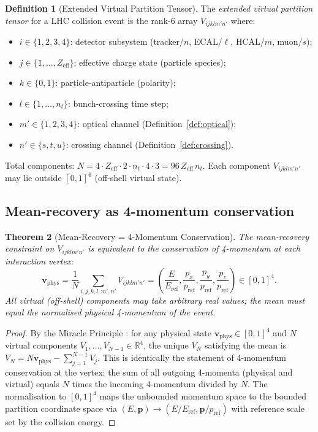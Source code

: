 \documentclass[twocolumn,10pt,a4paper]{article}
\theoremstyle{thmstyle}
\newtheorem{theorem}{Theorem}[section]
\theoremstyle{definition}
\newtheorem{definition}[theorem]{Definition}
\theoremstyle{remark}
\newcommand{\R}{\mathbb{R}}
\begin{document}
\begin{definition}[Extended Virtual Partition Tensor]
\label{def:tensor}
The \emph{extended virtual partition tensor} for a LHC collision event is
the rank-6 array $V_{ijklm'n'}$ where:
\begin{itemize}[nosep]
\item $i \in \{1,2,3,4\}$: detector subsystem (tracker/$n$, ECAL/$\ell$,
  HCAL/$m$, muon/$s$);
\item $j \in \{1,\ldots,Z_\text{eff}\}$: effective charge state
  (particle species);
\item $k \in \{0,1\}$: particle-antiparticle (polarity);
\item $l \in \{1,\ldots,n_t\}$: bunch-crossing time step;
\item $m' \in \{1,2,3,4\}$: optical channel (Definition~\ref{def:optical});
\item $n' \in \{s,t,u\}$: crossing channel (Definition~\ref{def:crossing}).
\end{itemize}
Total components: $N = 4 \cdot Z_\text{eff} \cdot 2 \cdot n_t \cdot 4 \cdot 3
= 96\,Z_\text{eff}\,n_t$.
Each component $V_{ijklm'n'}$ may lie outside $[0,1]^6$ (off-shell virtual
state).
\end{definition}

\subsection{Mean-recovery as 4-momentum conservation}

\begin{theorem}[Mean-Recovery = 4-Momentum Conservation]
\label{thm:mean_recovery}
The mean-recovery constraint on $V_{ijklm'n'}$ is equivalent to the
conservation of 4-momentum at each interaction vertex:
\begin{equation}
\mathbf{v}_\text{phys} = \frac{1}{N}\sum_{i,j,k,l,m',n'} V_{ijklm'n'}
= \left(\frac{E}{E_\text{ref}}, \frac{p_x}{p_\text{ref}},
  \frac{p_y}{p_\text{ref}}, \frac{p_z}{p_\text{ref}}\right) \in [0,1]^4.
\label{eq:mean_recovery_lhc}
\end{equation}
All virtual (off-shell) components may take arbitrary real values; the
mean must equal the normalised physical 4-momentum of the event.
\end{theorem}

\begin{proof}
By the Miracle Principle \citep{companion:tensor}: for any physical state
$\mathbf{v}_\text{phys} \in [0,1]^4$ and $N$ virtual components
$V_1, \ldots, V_{N-1} \in \R^4$, the unique $V_N$ satisfying the mean
is $V_N = N\mathbf{v}_\text{phys} - \sum_{j=1}^{N-1}V_j$.
This is identically the statement of 4-momentum conservation at the vertex:
the sum of all outgoing 4-momenta (physical and virtual) equals $N$ times
the incoming 4-momentum divided by $N$.  The normalisation to $[0,1]^4$
maps the unbounded momentum space to the bounded partition coordinate space
via $(E, \mathbf{p}) \to (E/E_\text{ref}, \mathbf{p}/p_\text{ref})$ with
reference scale set by the collision energy.
\end{proof}
\end{document}
